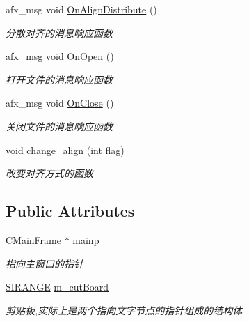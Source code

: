 \begin{DoxyCompactItemize}
afx\+\_\+msg void \hyperlink{class_c_notepad_app_abbcfd489cd0440ed1551fe41396f6cdd}{On\+Align\+Distribute} ()
\begin{DoxyCompactList}\small\item\em 分散对齐的消息响应函数 \end{DoxyCompactList}\item 
\mbox{\label{class_c_notepad_app_afcebb68584ad362f5dfba2449194531d}} 
afx\+\_\+msg void \hyperlink{class_c_notepad_app_afcebb68584ad362f5dfba2449194531d}{On\+Open} ()
\begin{DoxyCompactList}\small\item\em 打开文件的消息响应函数 \end{DoxyCompactList}\item 
\mbox{\label{class_c_notepad_app_a9fcc45c39d4fb4866c0b7f2e1f1b27c0}} 
afx\+\_\+msg void \hyperlink{class_c_notepad_app_a9fcc45c39d4fb4866c0b7f2e1f1b27c0}{On\+Close} ()
\begin{DoxyCompactList}\small\item\em 关闭文件的消息响应函数 \end{DoxyCompactList}\item 
\mbox{\label{class_c_notepad_app_aedb9f07cbb0e5ef12c51f6e829c3a1bf}} 
void \hyperlink{class_c_notepad_app_aedb9f07cbb0e5ef12c51f6e829c3a1bf}{change\+\_\+align} (int flag)
\begin{DoxyCompactList}\small\item\em 改变对齐方式的函数 \end{DoxyCompactList}\end{DoxyCompactItemize}
\subsection*{Public Attributes}
\begin{DoxyCompactItemize}
\item 
\mbox{\label{class_c_notepad_app_a9eee0a246d98c97f2554d5bd292bf3f1}} 
\hyperlink{class_c_main_frame}{C\+Main\+Frame} $\ast$ \hyperlink{class_c_notepad_app_a9eee0a246d98c97f2554d5bd292bf3f1}{mainp}
\begin{DoxyCompactList}\small\item\em 指向主窗口的指针 \end{DoxyCompactList}\item 
\mbox{\label{class_c_notepad_app_a7659b246dc9d6690527694f35d31416f}} 
\hyperlink{struct_s_i_r_a_n_g_e}{S\+I\+R\+A\+N\+GE} \hyperlink{class_c_notepad_app_a7659b246dc9d6690527694f35d31416f}{m\+\_\+cut\+Board}
\begin{DoxyCompactList}\small\item\em 剪贴板,实际上是两个指向文字节点的指针组成的结构体 \end{DoxyCompactList}\end{DoxyCompactItemize}



